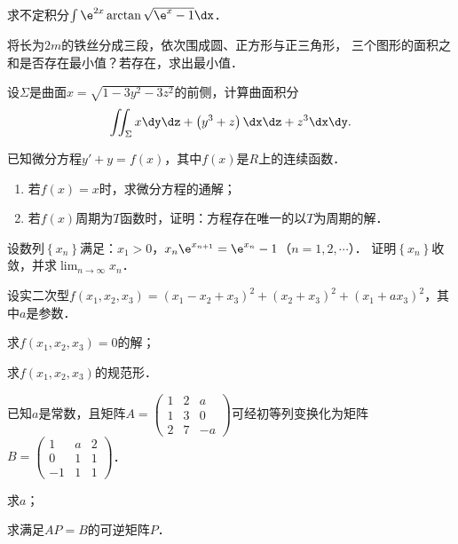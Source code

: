 \documentclass[plain,noanswer,medmath]{../../template/jnuexam}
\begin{document}


\begin{problem}[points=10]
求不定积分$\int \e^{2x}\arctan \sqrt{\e^x - 1} \dx$．
\end{problem}


\begin{problem}[points=10]
将长为$2m$的铁丝分成三段，依次围成圆、正方形与正三角形，
三个图形的面积之和是否存在最小值？若存在，求出最小值．
\end{problem}


\begin{problem}[points=10]
设$\Sigma$是曲面$x = \sqrt{1 - 3y^2 - 3z^2}$的前侧，计算曲面积分
$$\iint_{\Sigma}x\dy\dz + \left(y^3 + z \right)\dx\dz + z^3 \dx\dy.$$
\end{problem}


\begin{problem}[points=10]
已知微分方程$y' + y = f(x)$，其中$f(x)$是$R$上的连续函数．
\begin{enumerate}
\item 若$f(x) = x$时，求微分方程的通解；
\item 若$f(x)$周期为$T$函数时，证明：方程存在唯一的以$T$为周期的解．
\end{enumerate}
\end{problem}


\begin{problem}[points=10]
设数列$\left\{x_n \right\}$满足：$x_1 > 0$，$x_n \e^{x_{n + 1}} = \e^{x_n} - 1$（$n = 1,2, \cdots$）．
证明$\left\{x_n \right\}$收敛，并求$\lim_{n \to \infty} x_n$．
\end{problem}


\begin{problem}[points=11]
设实二次型$f(x_1,x_2,x_3) = (x_1 - x_2 + x_3)^2 + (x_2 + x_3)^2 + (x_1 + ax_3)^2$，其中$a$是参数．\par
\begin{enumerate*}
\item 求$f(x_1,x_2,x_3) = 0$的解；
\item 求$f(x_1,x_2,x_3)$的规范形．
\end{enumerate*}
\end{problem}


\begin{problem}[points=11]
已知$a$是常数，且矩阵$A = \begin{pmatrix}
  1 & 2 & a \\
  1 & 3 & 0 \\
  2 & 7 & -a
\end{pmatrix}$可经初等列变换化为矩阵$B = \begin{pmatrix}
   1 & a & 2 \\
   0 & 1 & 1 \\
  -1 & 1 & 1
\end{pmatrix}$．\par
\begin{enumerate*}
\item 求$a$；
\item 求满足$AP = B$的可逆矩阵$P$．
\end{enumerate*}
\end{problem}
\end{document}
